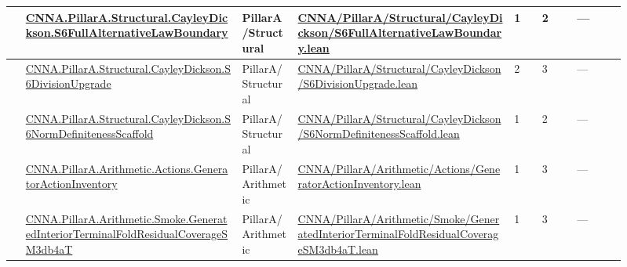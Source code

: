 \begin{longtable}{L{0.025\linewidth} L{0.315\linewidth} L{0.08\linewidth} L{0.315\linewidth} L{0.045\linewidth} L{0.055\linewidth} L{0.07\linewidth}}
\hline
{} & \href{run:repo_snapshot/CNNA/PillarA/Structural/CayleyDickson/S6FullAlternativeLawBoundary.lean}{CNNA.\allowbreak{}PillarA.\allowbreak{}Structural.\allowbreak{}CayleyDickson.\allowbreak{}S6FullAlternativeLawBoundary} & PillarA/\allowbreak{}Structural & \href{run:repo_snapshot/CNNA/PillarA/Structural/CayleyDickson/S6FullAlternativeLawBoundary.lean}{CNNA/\allowbreak{}PillarA/\allowbreak{}Structural/\allowbreak{}CayleyDickson/\allowbreak{}S6FullAlternativeLawBoundary.\allowbreak{}lean} & 1 & 2 & ---\\
\hline
{} & \href{run:repo_snapshot/CNNA/PillarA/Structural/CayleyDickson/S6DivisionUpgrade.lean}{CNNA.\allowbreak{}PillarA.\allowbreak{}Structural.\allowbreak{}CayleyDickson.\allowbreak{}S6DivisionUpgrade} & PillarA/\allowbreak{}Structural & \href{run:repo_snapshot/CNNA/PillarA/Structural/CayleyDickson/S6DivisionUpgrade.lean}{CNNA/\allowbreak{}PillarA/\allowbreak{}Structural/\allowbreak{}CayleyDickson/\allowbreak{}S6DivisionUpgrade.\allowbreak{}lean} & 2 & 3 & ---\\
\hline
{} & \href{run:repo_snapshot/CNNA/PillarA/Structural/CayleyDickson/S6NormDefinitenessScaffold.lean}{CNNA.\allowbreak{}PillarA.\allowbreak{}Structural.\allowbreak{}CayleyDickson.\allowbreak{}S6NormDefinitenessScaffold} & PillarA/\allowbreak{}Structural & \href{run:repo_snapshot/CNNA/PillarA/Structural/CayleyDickson/S6NormDefinitenessScaffold.lean}{CNNA/\allowbreak{}PillarA/\allowbreak{}Structural/\allowbreak{}CayleyDickson/\allowbreak{}S6NormDefinitenessScaffold.\allowbreak{}lean} & 1 & 2 & ---\\
\hline
{} & \href{run:repo_snapshot/CNNA/PillarA/Arithmetic/Actions/GeneratorActionInventory.lean}{CNNA.\allowbreak{}PillarA.\allowbreak{}Arithmetic.\allowbreak{}Actions.\allowbreak{}GeneratorActionInventory} & PillarA/\allowbreak{}Arithmetic & \href{run:repo_snapshot/CNNA/PillarA/Arithmetic/Actions/GeneratorActionInventory.lean}{CNNA/\allowbreak{}PillarA/\allowbreak{}Arithmetic/\allowbreak{}Actions/\allowbreak{}GeneratorActionInventory.\allowbreak{}lean} & 1 & 3 & ---\\
\hline
{} & \href{run:repo_snapshot/CNNA/PillarA/Arithmetic/Smoke/GeneratedInteriorTerminalFoldResidualCoverageSM3db4aT.lean}{CNNA.\allowbreak{}PillarA.\allowbreak{}Arithmetic.\allowbreak{}Smoke.\allowbreak{}GeneratedInteriorTerminalFoldResidualCoverageSM3db4aT} & PillarA/\allowbreak{}Arithmetic & \href{run:repo_snapshot/CNNA/PillarA/Arithmetic/Smoke/GeneratedInteriorTerminalFoldResidualCoverageSM3db4aT.lean}{CNNA/\allowbreak{}PillarA/\allowbreak{}Arithmetic/\allowbreak{}Smoke/\allowbreak{}GeneratedInteriorTerminalFoldResidualCoverageSM3db4aT.\allowbreak{}lean} & 1 & 3 & ---\\

\end{longtable}
